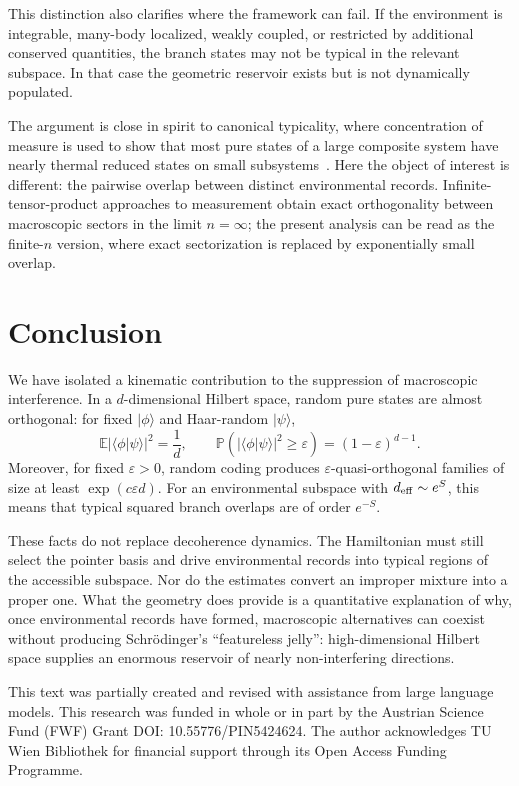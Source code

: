 \documentclass[aps,pra,reprint,superscriptaddress,nofootinbib,longbibliography]{revtex4-2}
\newcommand{\ket}[1]{| #1 \rangle}
\newcommand{\eps}{\varepsilon}
\begin{document}
This distinction also clarifies where the framework can fail. If the environment is integrable, many-body localized, weakly coupled, or restricted by additional conserved quantities, the branch states may not be typical in the relevant subspace. In that case the geometric reservoir exists but is not dynamically populated.

The argument is close in spirit to canonical typicality, where concentration of measure is used to show that most pure states of a large composite system have nearly thermal reduced states on small subsystems~\cite{popescu2006entanglement,goldstein2006canonical,reimann2008foundation}. Here the object of interest is different: the pairwise overlap between distinct environmental records. Infinite-tensor-product approaches to measurement obtain exact orthogonality between macroscopic sectors in the limit $n=\infty$; the present analysis can be read as the finite-$n$ version, where exact sectorization is replaced by exponentially small overlap.

\section{Conclusion}

We have isolated a kinematic contribution to the suppression of macroscopic interference. In a $d$-dimensional Hilbert space, random pure states are almost orthogonal: for fixed $\ket{\phi}$ and Haar-random $\ket{\psi}$,
\[
    \mathbb E|\langle\phi|\psi\rangle|^2=\frac1d,
    \qquad
    \mathbb P\!\left(|\langle\phi|\psi\rangle|^2\ge\eps\right)
    =(1-\eps)^{d-1}.
\]
Moreover, for fixed $\eps>0$, random coding produces $\eps$-quasi-orthogonal families of size at least $\exp(c\eps d)$. For an environmental subspace with $d_{\rm eff}\sim e^S$, this means that typical squared branch overlaps are of order $e^{-S}$.

These facts do not replace decoherence dynamics. The Hamiltonian must still select the pointer basis and drive environmental records into typical regions of the accessible subspace. Nor do the estimates convert an improper mixture into a proper one. What the geometry does provide is a quantitative explanation of why, once environmental records have formed, macroscopic alternatives can coexist without producing Schr\"odinger's ``featureless jelly'': high-dimensional Hilbert space supplies an enormous reservoir of nearly non-interfering directions.

\begin{acknowledgments}
This text was partially created and revised with assistance from large language models.
This research was funded in whole or in part by the Austrian Science Fund (FWF) Grant DOI: 10.55776/PIN5424624.
The author acknowledges TU Wien Bibliothek for financial support through its Open Access Funding Programme.
\end{acknowledgments}


\end{document}
